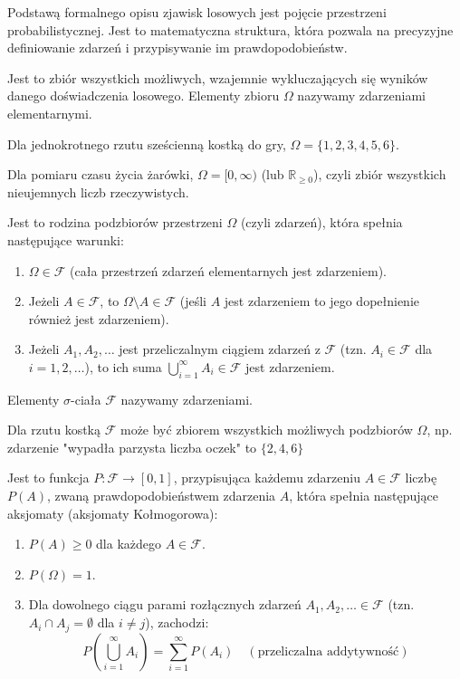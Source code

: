 \documentclass[final,a4paper,openany,12pt]{mwbk}
\begin{document}
Podstawą formalnego opisu zjawisk losowych jest pojęcie przestrzeni probabilistycznej. Jest to matematyczna struktura, która pozwala na precyzyjne definiowanie zdarzeń i przypisywanie im prawdopodobieństw.


\begin{Def} Jest to zbiór wszystkich możliwych, wzajemnie wykluczających się wyników danego doświadczenia losowego. Elementy zbioru $\Omega$ nazywamy zdarzeniami elementarnymi.
\end{Def}
\begin{Prz}
    Dla jednokrotnego rzutu sześcienną kostką do gry, $\Omega = \{1, 2, 3, 4, 5, 6\}$.
\end{Prz}
\begin{Prz}
    Dla pomiaru czasu życia żarówki, $\Omega = [0, \infty)$ (lub $\mathbb{R}_{\ge 0}$), czyli zbiór wszystkich nieujemnych liczb rzeczywistych.
\end{Prz}


\begin{Def}
Jest to rodzina podzbiorów przestrzeni $\Omega$ (czyli zdarzeń), która spełnia następujące warunki:
    \begin{enumerate}
        \item $\Omega \in \mathcal{F}$ (cała przestrzeń zdarzeń elementarnych jest zdarzeniem).
        \item Jeżeli $A \in \mathcal{F}$, to $\Omega \setminus A \in \mathcal{F}$ (jeśli $A$ jest zdarzeniem to jego dopełnienie również jest zdarzeniem).
        \item Jeżeli $A_1, A_2, \dots$ jest przeliczalnym ciągiem zdarzeń z $\mathcal{F}$ (tzn. $A_i \in \mathcal{F}$ dla $i=1, 2, \dots$), to ich suma $\bigcup_{i=1}^{\infty} A_i \in \mathcal{F}$ jest zdarzeniem.
    \end{enumerate}
    Elementy $\sigma$-ciała $\mathcal{F}$ nazywamy zdarzeniami.
\end{Def}
\begin{Prz}
            Dla rzutu kostką $\mathcal{F}$ może być zbiorem wszystkich możliwych podzbiorów $\Omega$, np. zdarzenie "wypadła parzysta liczba oczek" to $\{2,4,6\}$
\end{Prz}

\begin{Def}
Jest to funkcja $P: \mathcal{F} \to [0, 1]$, przypisująca każdemu zdarzeniu $A \in \mathcal{F}$ liczbę $P(A)$, zwaną prawdopodobieństwem zdarzenia $A$, która spełnia następujące aksjomaty (aksjomaty Kołmogorowa):
\begin{enumerate}
    \item $P(A) \ge 0$ dla każdego $A \in \mathcal{F}$.
    \item $P(\Omega) = 1$.
    \item Dla dowolnego ciągu parami rozłącznych zdarzeń $A_1, A_2, \dots \in \mathcal{F}$ (tzn. $A_i \cap A_j = \emptyset$ dla $i \neq j$), zachodzi:
    $$P\left(\bigcup_{i=1}^{\infty} A_i\right) = \sum_{i=1}^{\infty} P(A_i) \quad (\text{przeliczalna addytywność})$$
\end{enumerate}
        
    \end{Def}
\end{document}
